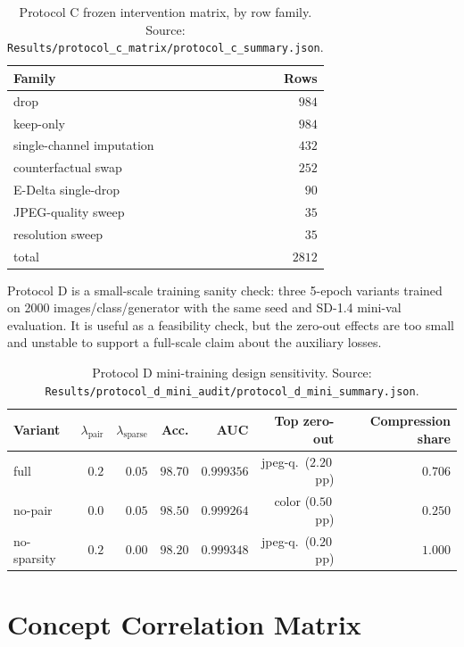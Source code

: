 \begin{table}[h]
  \centering
  \caption{Protocol C frozen intervention matrix, by row family. Source:
    \texttt{Results/protocol\_c\_matrix/protocol\_c\_summary.json}.}
  \label{tab:protocol-c-matrix}
  \small
  \begin{tabular}{lr}
    \toprule
    Family & Rows \\
    \midrule
    drop & $984$ \\
    keep-only & $984$ \\
    single-channel imputation & $432$ \\
    counterfactual swap & $252$ \\
    E-Delta single-drop & $90$ \\
    JPEG-quality sweep & $35$ \\
    resolution sweep & $35$ \\
    \midrule
    total & $2812$ \\
    \bottomrule
  \end{tabular}
\end{table}

Protocol D is a small-scale training sanity check: three 5-epoch variants trained on
2000 images/class/generator with the same seed and SD-1.4 mini-val evaluation. It is useful as a
feasibility check, but the zero-out effects are too small and unstable to support a full-scale
claim about the auxiliary losses.

\begin{table}[h]
  \centering
  \caption{Protocol D mini-training design sensitivity. Source:
    \texttt{Results/protocol\_d\_mini\_audit/protocol\_d\_mini\_summary.json}.}
  \label{tab:protocol-d-mini}
  \small
  \begin{tabular}{lrrrrrr}
    \toprule
    Variant & $\lambda_{\text{pair}}$ & $\lambda_{\text{sparse}}$ & Acc. & AUC
      & Top zero-out & Compression share \\
    \midrule
    full        & $0.2$ & $0.05$ & $98.70$ & $0.999356$ & jpeg-q.\ ($2.20$\,pp) & $0.706$ \\
    no-pair     & $0.0$ & $0.05$ & $98.50$ & $0.999264$ & color ($0.50$\,pp)   & $0.250$ \\
    no-sparsity & $0.2$ & $0.00$ & $98.20$ & $0.999348$ & jpeg-q.\ ($0.20$\,pp) & $1.000$ \\
    \bottomrule
  \end{tabular}
\end{table}

\section{Concept Correlation Matrix}
\label{app:corr}

